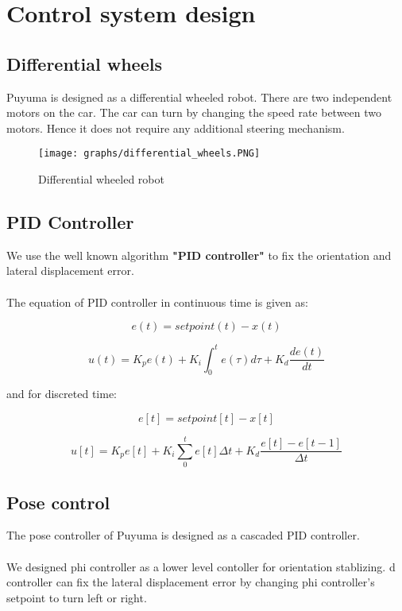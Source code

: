 \documentclass{article}
\begin{document}
\clearpage

\section{Control system design}

\subsection{Differential wheels}

Puyuma is designed as a differential wheeled robot. There are two independent motors on the car. The car can turn by changing the speed rate between two motors. Hence it does not require any additional steering mechanism.

\begin{figure}[ht]
  \label{fig:ground projection}
  \centering
  \texttt{[image: graphs/differential\_wheels.PNG]}
  \caption{Differential wheeled robot}
\end{figure}
\FloatBarrier

\subsection{PID Controller}

We use the well known algorithm \textbf{"PID controller"} to fix the orientation and lateral displacement error.
\\
\\
The equation of PID controller in continuous time is given as:

\[e(t) = setpoint(t) - x(t)\]

\[u(t) = K_p e(t) + K_i \int_{0}^{t} e(\tau) d\tau + K_d  \frac{de(t)}{dt}\]

\noindent and for discreted time:

\[e[t] = setpoint[t] - x[t]\]

\[u[t] = K_p e[t] + K_i \sum_0^t e[t] \Delta t + K_d \frac{e[t] - e[t-1]}{\Delta t}\]

\subsection{Pose control}

The pose controller of Puyuma is designed as a cascaded PID controller.
\\
\\
We designed phi controller as a lower level contoller for orientation stablizing. d controller can fix the lateral displacement error by changing phi controller's setpoint to turn left or right.
\end{document}
